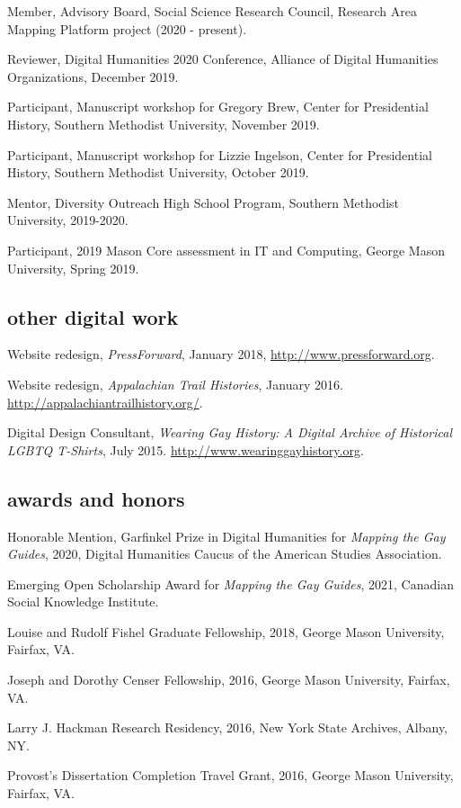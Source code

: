 \documentclass[11pt]{article}
\begin{document}
Member, Advisory Board, Social Science Research Council, Research Area Mapping Platform project (2020 - present).

Reviewer, Digital Humanities 2020 Conference, Alliance of Digital Humanities Organizations, December 2019.

Participant, Manuscript workshop for Gregory Brew, Center for Presidential History, Southern Methodist University, November 2019.

Participant, Manuscript workshop for Lizzie Ingelson, Center for Presidential History, Southern Methodist University, October 2019.

Mentor, Diversity Outreach High School Program, Southern Methodist University, 2019-2020.

Participant, 2019 Mason Core assessment in IT and Computing, George Mason University, Spring 2019.

\subsection{other digital work}\label{other-digital-work}

Website redesign, \emph{PressForward}, January 2018, \url{http://www.pressforward.org}.

Website redesign, \emph{Appalachian Trail Histories}, January 2016. \url{http://appalachiantrailhistory.org/}.

Digital Design Consultant, \emph{Wearing Gay History: A Digital Archive of Historical LGBTQ T-Shirts}, July 2015. \url{http://www.wearinggayhistory.org}.

\subsection{awards and honors}
Honorable Mention, Garfinkel Prize in Digital Humanities for \emph{Mapping the Gay Guides}, 2020, Digital Humanities Caucus of the American Studies Association.

Emerging Open Scholarship Award for \emph{Mapping the Gay Guides}, 2021, Canadian Social Knowledge Institute.

Louise and Rudolf Fishel Graduate Fellowship, 2018, George Mason University, Fairfax, VA.

Joseph and Dorothy Censer Fellowship, 2016, George Mason University, Fairfax, VA.

Larry J. Hackman Research Residency, 2016, New York State Archives, Albany, NY.

Provost's Dissertation Completion Travel Grant, 2016, George Mason University, Fairfax, VA.
\end{document}
